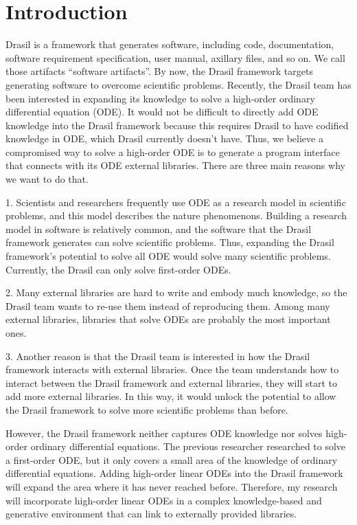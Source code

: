\chapter{Introduction}
Drasil is a framework that generates software, including code, documentation, software requirement specification, user manual, axillary files, and so on. We call those artifacts ``software artifacts''. By now, the Drasil framework targets generating software to overcome scientific problems. Recently, the Drasil team has been interested in expanding its knowledge to solve a high-order ordinary differential equation (ODE). It would not be difficult to directly add ODE knowledge into the Drasil framework because this requires Drasil to have codified knowledge in ODE, which Drasil currently doesn't have. Thus, we believe a compromised way to solve a high-order ODE is to generate a program interface that connects with its ODE external libraries. There are three main reasons why we want to do that.

1. Scientists and researchers frequently use ODE as a research model in scientific problems, and this model describes the nature phenomenons. Building a research model in software is relatively common, and the software that the Drasil framework generates can solve scientific problems. Thus, expanding the Drasil framework's potential to solve all ODE would solve many scientific problems. Currently, the Drasil can only solve first-order ODEs.

2. Many external libraries are hard to write and embody much knowledge, so the Drasil team wants to re-use them instead of reproducing them. Among many external libraries, libraries that solve ODEs are probably the most important ones. 

3. Another reason is that the Drasil team is interested in how the Drasil framework interacts with external libraries. Once the team understands how to interact between the Drasil framework and external libraries, they will start to add more external libraries. In this way, it would unlock the potential to allow the Drasil framework to solve more scientific problems than before. 

However, the Drasil framework neither captures ODE knowledge nor solves high-order ordinary differential equations. The previous researcher researched to solve a first-order ODE, but it only covers a small area of the knowledge of ordinary differential equations. Adding high-order linear ODEs into the Drasil framework will expand the area where it has never reached before. Therefore, my research will incorporate high-order linear ODEs in a complex knowledge-based and generative environment that can link to externally provided libraries.

